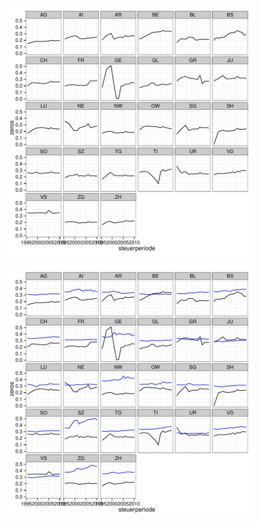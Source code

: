 \documentclass[twoside]{article}\usepackage[]{graphicx}\usepackage[]{color}
\makeatletter
\def\maxwidth{ %
  \ifdim\Gin@nat@width>\linewidth
    \linewidth
  \else
    \Gin@nat@width
  \fi
}
\newenvironment{knitrout}{}{} %
\makeatother
\begin{document}
\begin{multicols}{2}
\begin{knitrout}
\color{fgcolor}
\includegraphics[width=\maxwidth]{figure/zero_descriptives1} 

\includegraphics[width=\maxwidth]{figure/zero_descriptives2} 


\end{knitrout}
\end{multicols}
\end{document}

